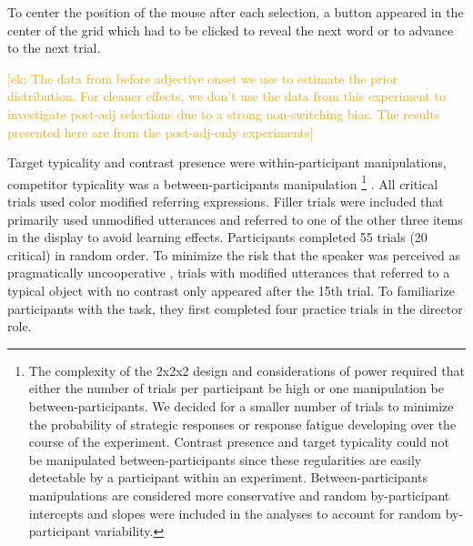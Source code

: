 \documentclass[a4paper,man,floatsintext,natbib]{apa6}
\newcommand{\ek}[1]{\textcolor{Orange}{[ek: #1]}}
\begin{document}
To center the position of the mouse after each selection, a button appeared in the center of the grid which had to be clicked to reveal the next word or to advance to the next trial. 

\ek{The data from before adjective onset we use to estimate the prior distribution. For cleaner effects, we don't use the data from this experiment to investigate post-adj selections due to a strong non-switching bias. The results presented here are from the post-adj-only experiments}

Target typicality and contrast presence were within-participant manipulations, competitor typicality was a between-participants manipulation
\footnote{The complexity of the 2x2x2 design and considerations of power required that either the number of trials per participant  be high or one manipulation  be between-participants. We decided for a smaller number of trials to minimize the probability of strategic responses or response fatigue developing over the course of the experiment. Contrast presence and target typicality could not be manipulated between-participants since these regularities are easily detectable by a participant within an experiment. Between-participants manipulations are considered more conservative \cite{Charness:2012} and random by-participant intercepts and slopes were included in the analyses to account for random by-participant variability.}
. All critical trials used color modified referring expressions. 
Filler trials were included that primarily used unmodified utterances and referred to one of the other three items in the display to avoid learning effects. 
Participants completed 55 trials (20 critical) in random order. To minimize the risk that the speaker was perceived as pragmatically uncooperative \cite{Grodner:2011,Pogue:2016,Ryskin:2019}, trials with modified utterances that referred to a typical object with no contrast only appeared after the 15th trial. To familiarize participants with the task, they first completed four practice trials in the director role.
 
\end{document}
